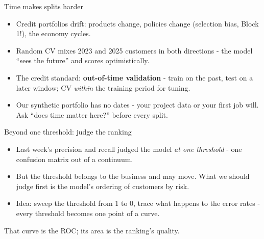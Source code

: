 \documentclass[10pt,aspectratio=169]{beamer}
\begin{document}
\begin{frame}{Time makes splits harder}
  \begin{itemize}
    \item Credit portfolios \alert{drift}: products change, policies change
          (selection bias, Block 1!), the economy cycles.
    \item Random CV mixes 2023 and 2025 customers in both directions -
          the model ``sees the future'' and scores optimistically.
    \item The credit standard: \textbf{out-of-time validation} - train on
          the past, test on a later window; CV \emph{within} the training
          period for tuning.
    \item Our synthetic portfolio has no dates - your project data or your
          first job will. Ask ``\alert{does time matter here?}'' before
          every split.
  \end{itemize}
\end{frame}

\begin{frame}{Beyond one threshold: judge the ranking}
  \begin{itemize}
    \item Last week's precision and recall judged the model \emph{at one
          threshold} - one confusion matrix out of a continuum.
    \item But the threshold belongs to the business and may move. What we
          should judge first is the model's \alert{ordering} of customers by
          risk.
    \item Idea: sweep the threshold from 1 to 0, trace what happens to the
          error rates - every threshold becomes one point of a curve.
  \end{itemize}
  \vspace{0.6em}
  \begin{center}
    That curve is the \alert{ROC}; its area is the ranking's quality.
  \end{center}
\end{frame}
\end{document}
